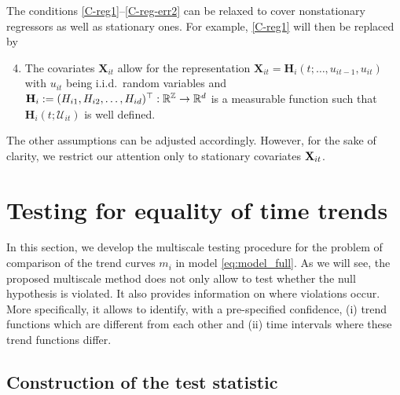 \documentclass[a4paper,12pt]{article}
\begin{document}
\begin{remark}
The conditions \ref{C-reg1}--\ref{C-reg-err2} can be relaxed to cover nonstationary regressors as well as stationary ones. For example, \ref{C-reg1} will then be replaced by
\begin{enumerate}[label=(C\arabic*$^\ast$),leftmargin=1.05cm]
\setcounter{enumi}{3}
\item \label{C-reg1-star} The covariates $ \mathbf{X}_{it}$ allow for the representation $ \mathbf{X}_{it} = \mathbf{H}_i(t; \ldots,u_{it-1},u_{it})$ with $u_{it}$ being i.i.d.\ random variables and $\mathbf{H}_i := (H_{i1}, H_{i2}, \ldots, H_{id})^\top: \mathbb{R}^{\mathbb{Z}} \rightarrow \mathbb{R}^d$ is a measurable function such that $\mathbf{H}_i(t;\mathcal{U}_{it})$ is well defined. 
\end{enumerate} 
The other assumptions can be adjusted accordingly. However, for the sake of clarity, we restrict our attention only to stationary  covariates $\mathbf{X}_{it}$. 
\end{remark}


\section{Testing for equality of time trends}\label{sec:test}

In this section, we develop the multiscale testing procedure for the problem of comparison of the trend curves $m_i$ in model \eqref{eq:model_full}.  As we will see, the proposed multiscale method does not only allow to test whether the null hypothesis is violated. It also provides information on where violations occur. More specifically, it allows to identify, with a pre-specified confidence, (i) trend functions which are different from each other and (ii) time intervals where these trend functions differ.



\subsection{Construction of the test statistic}\label{subsec:test:stat}
\end{document}
